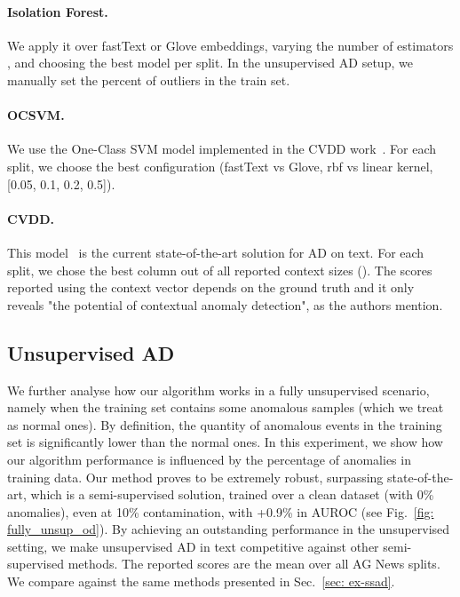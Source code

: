 \documentclass[11pt]{article}
\begin{document}
\paragraph{Isolation Forest.} We apply it over fastText or Glove embeddings, varying the number of estimators , and choosing the best model per split. In the unsupervised AD setup, we manually set the percent of outliers in the train set.

\paragraph{OCSVM.} We use the One-Class SVM model implemented in the CVDD work~\footnotemark[\value{footnote}]. For each split, we choose the best configuration (fastText vs Glove, rbf vs linear kernel,   [0.05, 0.1, 0.2, 0.5]).

\paragraph{CVDD.} This model~\cite{acl2019} is the current state-of-the-art solution for AD on text. For each split, we chose the best column out of all reported context sizes (). The scores reported using the  context vector depends on the ground truth and it only reveals "the potential of contextual anomaly detection", as the authors mention.






\subsection{Unsupervised AD}
\label{sec: ex-uad}
We further analyse how our algorithm works in a fully unsupervised scenario, namely when the training set contains some anomalous samples (which we treat as normal ones). By definition, the quantity of anomalous events in the training set is significantly lower than the normal ones. In this experiment, we show how our algorithm performance is influenced by the percentage of anomalies in training data. Our method proves to be extremely robust, surpassing state-of-the-art, which is a semi-supervised solution, trained over a clean dataset (with 0\% anomalies), even at 10\% contamination, with +0.9\% in AUROC (see Fig.~\ref{fig: fully_unsup_od}). By achieving an outstanding performance in the unsupervised setting, we make unsupervised AD in text competitive against other semi-supervised methods. The reported scores are the mean over all AG News splits. We compare against the same methods presented in Sec.~\ref{sec: ex-ssad}.
\end{document}
